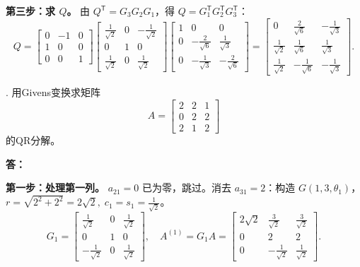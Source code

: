 \documentclass{article}
\begin{document}
\textbf{第三步：求 $Q$。}
由 $Q^{\mathsf T}=G_3G_2G_1$，得 $Q=G_1^{\mathsf T}G_2^{\mathsf T}G_3^{\mathsf T}$：
\[
Q = \begin{bmatrix}
0 & -1 & 0\\1 & 0 & 0\\0 & 0 & 1
\end{bmatrix}
\begin{bmatrix}
\frac{1}{\sqrt{2}} & 0 & -\frac{1}{\sqrt{2}}\\[4pt]
0 & 1 & 0\\[4pt]
\frac{1}{\sqrt{2}} & 0 & \frac{1}{\sqrt{2}}
\end{bmatrix}
\begin{bmatrix}
1 & 0 & 0\\[4pt]
0 & -\frac{2}{\sqrt{6}} & \frac{1}{\sqrt{3}}\\[4pt]
0 & -\frac{1}{\sqrt{3}} & -\frac{2}{\sqrt{6}}
\end{bmatrix}
= \begin{bmatrix}
0 & \frac{2}{\sqrt{6}} & -\frac{1}{\sqrt{3}}\\[4pt]
\frac{1}{\sqrt{2}} & \frac{1}{\sqrt{6}} & \frac{1}{\sqrt{3}}\\[4pt]
\frac{1}{\sqrt{2}} & -\frac{1}{\sqrt{6}} & -\frac{1}{\sqrt{3}}
\end{bmatrix}.
\]
\newpage

. 用Givens变换求矩阵
\[
A=\begin{bmatrix}
2 & 2 & 1 \\
0 & 2 & 2 \\
2 & 1 & 2
\end{bmatrix}
\]
的QR分解。

\noindent \textbf{答：}

\textbf{第一步：处理第一列。}
$a_{21}=0$ 已为零，跳过。消去 $a_{31}=2$：构造 $G(1,3,\theta_1)$，
$r=\sqrt{2^2+2^2}=2\sqrt{2},\;c_1=s_1=\frac{1}{\sqrt{2}}$。
\[
G_1=\begin{bmatrix}
\frac{1}{\sqrt{2}} & 0 & \frac{1}{\sqrt{2}}\\[4pt]
0 & 1 & 0\\[4pt]
-\frac{1}{\sqrt{2}} & 0 & \frac{1}{\sqrt{2}}
\end{bmatrix},\quad
A^{(1)}=G_1A=\begin{bmatrix}
2\sqrt{2} & \frac{3}{\sqrt{2}} & \frac{3}{\sqrt{2}}\\[4pt]
0 & 2 & 2\\[4pt]
0 & -\frac{1}{\sqrt{2}} & \frac{1}{\sqrt{2}}
\end{bmatrix}.
\]
\end{document}
